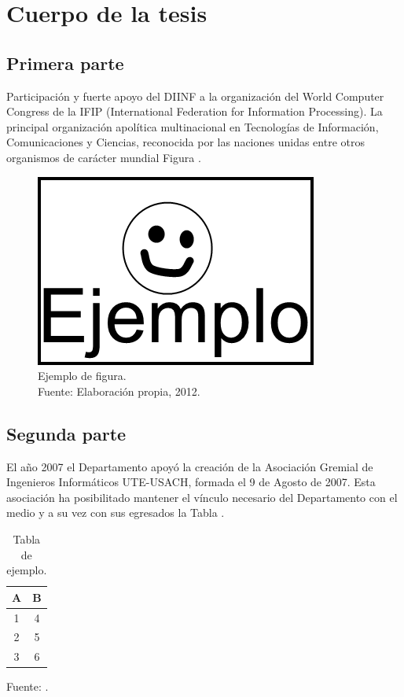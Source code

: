 \chapter{Cuerpo de la tesis}
\label{cap:cuerpo}

\section{Primera parte}
\label{sec:primera}
Participación y fuerte apoyo del DIINF a la organización del World Computer Congress de la IFIP (International Federation for Information Processing). La principal organización apolítica multinacional en Tecnologías de Información, Comunicaciones y Ciencias, reconocida por las naciones unidas entre otros organismos de carácter mundial Figura .

\begin{figure}[!ht]
	\centering
	\captionsetup{justification=centering}
	\includegraphics[scale=0.6]{images/Ejemplo.png}
	\caption[Ejemplo de figura.]{Ejemplo de figura.\\Fuente: Elaboraci\'on propia, 2012.}
	\label{fig:ejemplo}
\end{figure}

\section{Segunda parte}
\label{sec:segunda}

El año 2007 el Departamento apoyó la creación de la Asociación Gremial de Ingenieros Informáticos UTE-USACH, formada el 9 de Agosto de 2007. Esta asociación ha posibilitado mantener el vínculo necesario del Departamento con el medio y a su vez con sus egresados la Tabla .

\begin{table}[!ht]
	\begin{center}
		\caption{Tabla de ejemplo.}
		\begin{tabular}{| c | c |}
			\hline
			A & B \\ \hline
			1 & 4 \\
			2 & 5 \\
			3 & 6 \\\hline
		\end{tabular}
		\label{tab:ejemplo}
	\end{center}
	\begin{center}
		Fuente: \cite{MeriaudeauS15}.
	\end{center}
\end{table}

